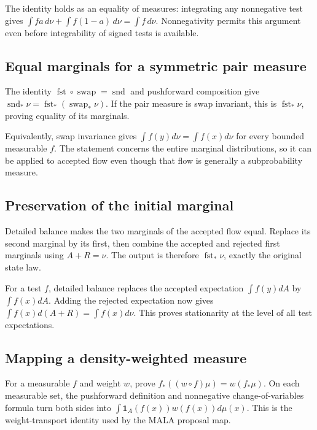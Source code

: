 \documentclass[11pt,a4paper]{article}
\begin{document}
The identity holds as an equality of measures: integrating any nonnegative test gives \(\int f a\,d\nu+\int f(1-a)\,d\nu=\int f\,d\nu\). Nonnegativity permits this argument even before integrability of signed tests is available.


\subsection{\texorpdfstring{Equal marginals for a symmetric pair measure}{Equal marginals for a symmetric pair measure}}


The identity \(\operatorname{fst}\circ\operatorname{swap}=\operatorname{snd}\) and pushforward composition give \(\operatorname{snd}_*\nu=\operatorname{fst}_*(\operatorname{swap}_*\nu)\). If the pair measure is swap invariant, this is \(\operatorname{fst}_*\nu\), proving equality of its marginals.



Equivalently, swap invariance gives \(\int f(y)d\nu=\int f(x)d\nu\) for every bounded measurable \(f\). The statement concerns the entire marginal distributions, so it can be applied to accepted flow even though that flow is generally a subprobability measure.


\subsection{\texorpdfstring{Preservation of the initial marginal}{Preservation of the initial marginal}}


Detailed balance makes the two marginals of the accepted flow equal. Replace its second marginal by its first, then combine the accepted and rejected first marginals using \(A+R=\nu\). The output is therefore \(\operatorname{fst}_*\nu\), exactly the original state law.



For a test \(f\), detailed balance replaces the accepted expectation \(\int f(y)dA\) by \(\int f(x)dA\). Adding the rejected expectation now gives \(\int f(x)d(A+R)=\int f(x)d\nu\). This proves stationarity at the level of all test expectations.


\subsection{\texorpdfstring{Mapping a density-weighted measure}{Mapping a density-weighted measure}}


For a measurable \(f\) and weight \(w\), prove \(f_*((w\circ f)\mu)=w(f_*\mu)\). On each measurable set, the pushforward definition and nonnegative change-of-variables formula turn both sides into \(\int\mathbf1_A(f(x))w(f(x))d\mu(x)\). This is the weight-transport identity used by the MALA proposal map.
\end{document}
